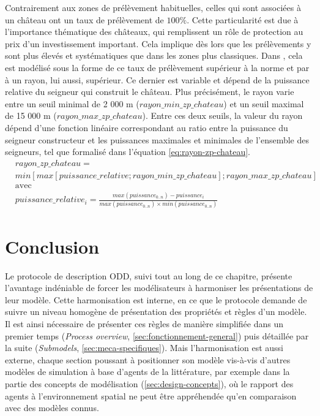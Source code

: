 Contrairement aux zones de prélèvement habituelles, celles qui sont associées à un château ont un taux de prélèvement de $100\%$.
Cette particularité est due à l'importance thématique des châteaux, qui remplissent un rôle de protection au prix d'un investissement important.
Cela implique dès lors que les prélèvements y sont plus élevés et systématiques que dans les zones plus classiques.
Dans \simfeodal{}, cela est modélisé sous la forme de ce taux de prélèvement supérieur à la norme et par à un rayon, lui aussi, supérieur.
Ce dernier est variable et dépend de la puissance relative du seigneur qui construit le château.
Plus précisément, le rayon varie entre un seuil minimal de 2 000 m ($rayon\_min\_zp\_chateau$) et un seuil maximal de 15 000 m ($rayon\_max\_zp\_chateau$).
Entre ces deux seuils, la valeur du rayon dépend d'une fonction linéaire correspondant au ratio entre la puissance du seigneur constructeur et les puissances maximales et minimales de l'ensemble des seigneurs, tel que formalisé dans l'équation \ref{eq:rayon-zp-chateau}. 
\begin{equation}\label{eq:rayon-zp-chateau}
\begin{aligned}
& rayon\_zp\_chateau = \\
& min \left[ max \left[ puissance\_relative; rayon\_min\_zp\_chateau \right] ; rayon\_max\_zp\_chateau \right]
\\
& \text{avec}
\\
& puissance\_relative_i = \frac{max(puissance_{0..n}) - puissance_i}{max(puissance_{0..n}) \times min(puissance_{0..n})}
\end{aligned}
\end{equation}

\section*{Conclusion}

Le protocole de description ODD, suivi tout au long de ce chapitre, présente l'avantage indéniable de forcer les modélisateurs à harmoniser les présentations de leur modèle.
Cette harmonisation est \og interne\fg{}, en ce que le protocole demande de suivre un niveau homogène de présentation des propriétés et règles d'un modèle.
Il est ainsi nécessaire de présenter ces règles de manière simplifiée dans un premier temps (\textit{Process overview}, \cref{sec:fonctionnement-general}) puis détaillée par la suite (\textit{Submodels}, \cref{sec:meca-specifiques}).
Mais l'harmonisation est aussi \og externe\fg{}, chaque section poussant à positionner son modèle vis-à-vis d'autres modèles de simulation à base d'agents de la littérature, par exemple dans la partie des \og concepts de modélisation\fg{} (\cref{sec:design-concepts}), où le rapport des agents à l'environnement spatial ne peut être appréhendée qu'en comparaison avec des modèles connus.

